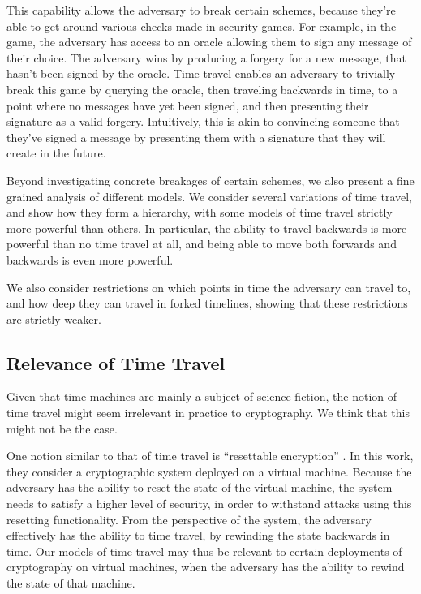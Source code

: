 This capability allows the adversary to break certain schemes,
because they're able to get around various checks made in security games.
For example, in the  game, the adversary has access to an
oracle allowing them to sign any message of their choice.
The adversary wins by producing a forgery for a new message, 
that hasn't been signed by the oracle.
Time travel enables an adversary to trivially break this game
by querying the oracle, then traveling backwards in time, to
a point where no messages have yet been signed, and then presenting
their signature as a valid forgery.
Intuitively, this is akin to convincing someone that they've signed
a message by presenting them with a signature that they will create
in the future.

Beyond investigating concrete breakages of certain schemes,
we also present a fine grained analysis of different models.
We consider several variations of time travel, and show how they
form a hierarchy, with some models of time travel strictly more powerful
than others.
In particular, the ability to travel backwards is more powerful
than no time travel at all, and being able to move both forwards and
backwards is even more powerful.

We also consider restrictions on which points in time the adversary
can travel to, and how deep they can travel in forked timelines,
showing that these restrictions are strictly weaker.

\subsection{Relevance of Time Travel}

Given that time machines are mainly a subject of science fiction,
the notion of time travel might seem irrelevant in practice to
cryptography.
We think that this might not be the case.

One notion similar to that of time travel is ``resettable encryption'' \cite{yil09}.
In this work, they consider a cryptographic system deployed on a virtual machine.
Because the adversary has the ability to reset the state of the virtual machine,
the system needs to satisfy a higher level of security, in order to withstand
attacks using this resetting functionality.
From the perspective of the system, the adversary effectively has the ability
to time travel, by rewinding the state backwards in time.
Our models of time travel may thus be relevant to certain deployments
of cryptography on virtual machines, when the adversary has the ability
to rewind the state of that machine.


